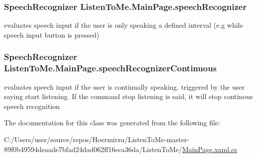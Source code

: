 \subsubsection[{\texorpdfstring{speech\+Recognizer}{speechRecognizer}}]{\setlength{\rightskip}{0pt plus 5cm}Speech\+Recognizer Listen\+To\+Me.\+Main\+Page.\+speech\+Recognizer\hspace{0.3cm}{\ttfamily [private]}}\hypertarget{class_listen_to_me_1_1_main_page_a56393ec41c67e438e12651f5dc44a2cc}{}\label{class_listen_to_me_1_1_main_page_a56393ec41c67e438e12651f5dc44a2cc}


evaluates speech input if the user is only speaking a defined interval (e.\+g while speech input button is pressed) 

\subsubsection[{\texorpdfstring{speech\+Recognizer\+Continuous}{speechRecognizerContinuous}}]{\setlength{\rightskip}{0pt plus 5cm}Speech\+Recognizer Listen\+To\+Me.\+Main\+Page.\+speech\+Recognizer\+Continuous\hspace{0.3cm}{\ttfamily [private]}}\hypertarget{class_listen_to_me_1_1_main_page_ac417ca2ffe02d44895c029bf23e8f83a}{}\label{class_listen_to_me_1_1_main_page_ac417ca2ffe02d44895c029bf23e8f83a}


evaluates speech input if the user is continually speaking. triggered by the user saying start listening. If the command stop listening is said, it will stop continous speech recognition 



The documentation for this class was generated from the following file\+:\begin{DoxyCompactItemize}
\item 
C\+:/\+Users/user/source/repos/\+Hoermirzu/\+Listen\+To\+Me-\/master-\/89f0b49594deaade7bfad24dad062ff16eca36da/\+Listen\+To\+Me/\hyperlink{_main_page_8xaml_8cs}{Main\+Page.\+xaml.\+cs}\end{DoxyCompactItemize}
